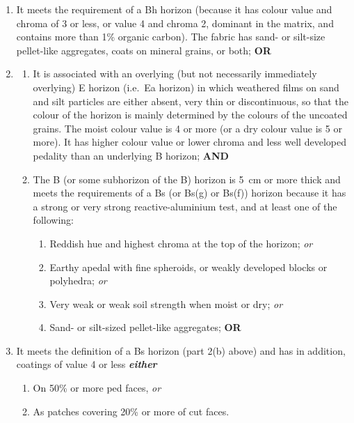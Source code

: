 \documentclass[
  letterpaper,
  DIV=11,
  numbers=noendperiod]{scrreprt}
\providecommand{\tightlist}{%
  \setlength{\itemsep}{0pt}\setlength{\parskip}{0pt}}\usepackage{longtable,booktabs,array}
\begin{document}
\begin{enumerate}
\def\labelenumi{\arabic{enumi}.}
\item
  It meets the requirement of a Bh horizon (because it has colour value
  and chroma of 3 or less, or value 4 and chroma 2, dominant in the
  matrix, and contains more than 1\% organic carbon). The fabric has
  sand- or silt-size pellet-like aggregates, coats on mineral grains, or
  both; \textbf{OR}
\item
  \begin{enumerate}
  \def\labelenumii{(\alph{enumii})}
  \tightlist
  \item
    It is associated with an overlying (but not necessarily immediately
    overlying) E horizon (i.e.~Ea horizon) in which weathered films on
    sand and silt particles are either absent, very thin or
    discontinuous, so that the colour of the horizon is mainly
    determined by the colours of the uncoated grains. The moist colour
    value is 4 or more (or a dry colour value is 5 or more). It has
    higher colour value or lower chroma and less well developed pedality
    than an underlying B horizon; \textbf{AND}
  \item
    The B (or some subhorizon of the B) horizon is 5~cm or more thick
    and meets the requirements of a Bs (or Bs(g) or Bs(f)) horizon
    because it has a strong or very strong reactive-aluminium test, and
    at least one of the following:

    \begin{enumerate}
    \def\labelenumiii{(\roman{enumiii})}
    \tightlist
    \item
      Reddish hue and highest chroma at the top of the horizon;
      \emph{or}
    \item
      Earthy apedal with fine spheroids, or weakly developed blocks or
      polyhedra; \emph{or}
    \item
      Very weak or weak soil strength when moist or dry; \emph{or}
    \item
      Sand- or silt-sized pellet-like aggregates; \textbf{OR}
    \end{enumerate}
  \end{enumerate}
\item
  It meets the definition of a Bs horizon (part 2(b) above) and has in
  addition, coatings of value 4 or less \textbf{\emph{either}}

  \begin{enumerate}
  \def\labelenumii{(\alph{enumii})}
  \tightlist
  \item
    On 50\% or more ped faces, \emph{or}
  \item
    As patches covering 20\% or more of cut faces.
  \end{enumerate}
\end{enumerate}
\end{document}
